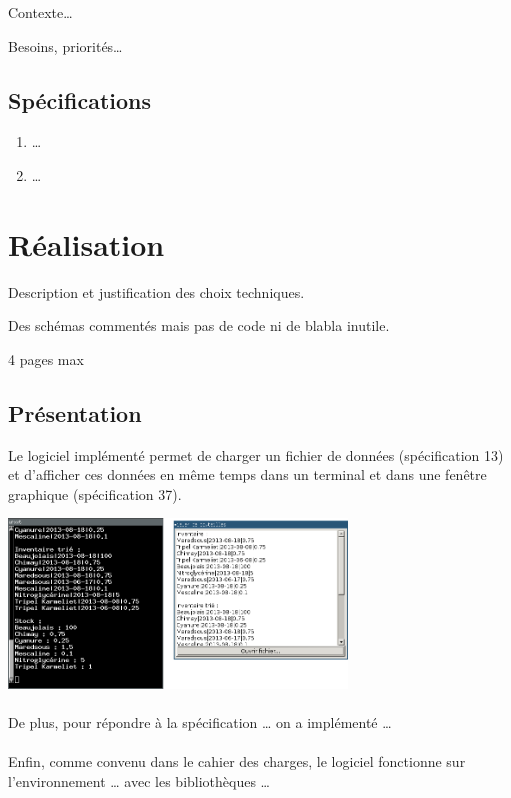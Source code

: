 \documentclass[a4paper,oneside]{article}
\begin{document}
Contexte…

Besoins, priorités…


\subsection{Spécifications}

\begin{enumerate}
    \item …
    \item …
\end{enumerate}

\clearpage



\section{Réalisation}
Description et justification des choix techniques. 

Des schémas commentés mais pas de code ni de blabla inutile.

4 pages max 

\subsection{Présentation }
Le logiciel implémenté permet de charger un fichier de données (spécification 13) et d'afficher ces données en même temps dans un terminal et dans une fenêtre graphique (spécification 37).

\begin{center}
\includegraphics[width=9cm]{capture_ecran.png}
\end{center}

\paragraph{}
De plus, pour répondre à la spécification … on a implémenté …

\paragraph{}
Enfin, comme convenu dans le cahier des charges, le logiciel fonctionne sur l'environnement … avec les bibliothèques …
\end{document}
